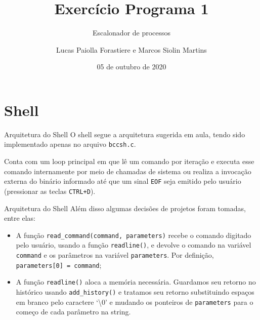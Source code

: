 \documentclass[10pt]{beamer}
\title{Exercício Programa 1}
\subtitle{Escalonador de processos}
\institute{IME-USP}
\author{Lucas Paiolla Forastiere e Marcos Siolin Martins}
\date{05 de outubro de 2020}
\begin{document}
    \maketitle
    \section{Shell}
    \begin{frame}{Arquitetura do Shell}
      O shell segue a arquitetura sugerida em aula, tendo sido implementado apenas no arquivo \texttt{bccsh.c}. 
      
      Conta com um loop principal em que lê um comando por iteração e executa esse comando internamente por meio de chamadas de sistema ou realiza a invocação externa do binário informado até que um sinal \texttt{EOF} seja emitido pelo usuário (pressionar as teclas \texttt{CTRL+D}).

    \end{frame}
    \begin{frame}{Arquitetura do Shell}
      Além disso algumas decisões de projetos foram tomadas, entre elas:
      \begin{itemize}
        \justifying
        \item A função \texttt{read\_command(command, parameters)} recebe o comando digitado pelo usuário, usando a função \texttt{readline()}, e devolve o comando na variável \texttt{command} e os parâmetros na variável \texttt{parameters}. Por definição, \texttt{parameters[0] = command};
        \item A função \texttt{readline()} aloca a memória necessária. Guardamos seu retorno no histórico usando \texttt{add\_history()} e tratamos seu retorno substituindo espaços em branco pelo caractere `\textbackslash 0' e mudando os ponteiros de \texttt{parameters} para o começo de cada parâmetro na string.
      \end{itemize}
    \end{frame}
\end{document}
